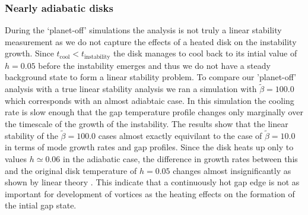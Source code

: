 \subsubsection{Nearly adiabatic disks}
\label{adiabatic_section}
During the `planet-off' simulations the analysis is not truly a linear stability measurement as we do not capture the effects of a heated disk on the instability growth. Since $t_{\mathrm{cool}}<t_{\mathrm{instability}}$ the disk manages to cool back to its intial value of $h=0.05$ before the instability emerges and thus we do not have a steady background state to form a linear stability problem. To compare our 'planet-off' analysis with a true linear stability analysis we ran a simulation  with $\tilde{\beta}=100.0$ which corresponds with an almost adiabtaic case. In this simulation the cooling rate is slow enough that the gap temperature profile changes only marginally over the timescale of the growth of the instability. The results show that the linear stability of the $\tilde{\beta}=100.0$ cases almost exactly equivilant to the case of $\tilde{\beta}=10.0$ in terms of mode growth rates and gap profiles. Since the disk heats up only to values $h\simeq0.06$ in the adiabatic case, the difference in growth rates between this and the original disk temperature of $h=0.05$ changes almost insignificantly as shown by linear theory \citep{li00}. This indicate that a continuously hot gap edge is not as important for development of vortices as the heating effects on the formation of the intial gap state.



